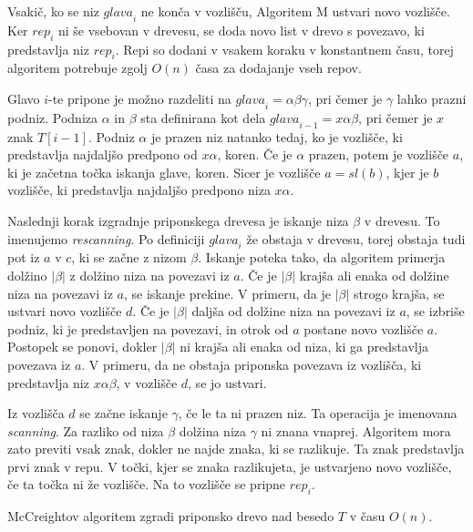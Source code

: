 Vsakič, ko se niz $\textit{glava}_i$ ne konča v vozlišču, Algoritem M ustvari novo vozlišče. Ker $\textit{rep}_i$ ni še vsebovan v drevesu, se doda novo list v drevo s povezavo, ki predstavlja niz $\textit{rep}_i$. Repi so dodani v vsakem koraku v konstantnem času, torej algoritem potrebuje zgolj $O(n)$ časa za dodajanje vseh repov.

Glavo $i$-te pripone je možno razdeliti na $\textit{glava}_i = \alpha\beta\gamma$, pri čemer je $\gamma$ lahko prazni podniz. Podniza $\alpha$ in $ \beta$ sta definirana kot dela $\textit{glava}_{i-1} = x\alpha\beta$, pri čemer je $x$ znak $T[i-1]$. Podniz $\alpha$ je prazen niz natanko tedaj, ko je vozlišče, ki predstavlja najdaljšo predpono od $x\alpha$, koren. Če je $\alpha$ prazen, potem je vozlišče $a$, ki je začetna točka iskanja glave, koren. Sicer je vozlišče $a=\textit{sl}(b)$, kjer je $b$ vozlišče, ki predstavlja najdaljšo predpono niza $x\alpha$.

Naslednji korak izgradnje priponskega drevesa je iskanje niza $\beta$ v drevesu. To imenujemo \textit{rescanning}. Po definiciji $\textit{glava}_i$ že obstaja v drevesu, torej obstaja tudi pot iz $a$ v $c$, ki se začne z nizom $\beta$. Iskanje poteka tako, da algoritem primerja dolžino $|\beta|$ z dolžino niza na povezavi iz $a$. Če je $|\beta|$ krajša ali enaka od dolžine niza na povezavi iz $a$, se iskanje prekine. V primeru, da je $|\beta|$ strogo krajša, se ustvari novo vozlišče $d$. Če je $|\beta|$ daljša od dolžine niza na povezavi iz $a$, se izbriše podniz, ki je predstavljen na povezavi, in otrok od $a$ postane novo vozlišče $a$. Postopek se ponovi, dokler $|\beta|$ ni krajša ali enaka od niza, ki ga predstavlja povezava iz $a$. V primeru, da ne obstaja priponska povezava iz vozlišča, ki predstavlja niz $x\alpha\beta$, v vozlišče $d$, se jo ustvari.

Iz vozlišča $d$ se začne iskanje $\gamma$, če le ta ni prazen niz. Ta operacija je imenovana \textit{scanning}. Za razliko od niza $\beta$ dolžina niza $\gamma$ ni znana vnaprej. Algoritem mora zato previti vsak znak, dokler ne najde znaka, ki se razlikuje. Ta znak predstavlja prvi znak v repu. V točki, kjer se znaka razlikujeta, je ustvarjeno novo vozlišče, če ta točka ni že vozlišče. Na to vozlišče se pripne $\textit{rep}_i$.


\begin{izr}
    McCreightov algoritem zgradi priponsko drevo nad besedo $T$ v času $O(n)$.
\end{izr}

